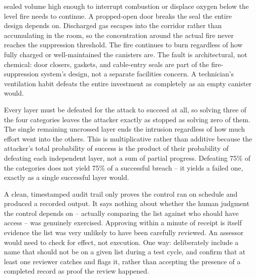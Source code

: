 \begin{answerkey}
sealed volume high enough to interrupt combustion or displace oxygen below the level fire needs to
continue. A propped-open door breaks the seal the entire design depends on.
Discharged gas escapes into the corridor rather than accumulating in the room, so the
concentration around the actual fire never reaches the suppression threshold. The fire continues
to burn regardless of how fully charged or well-maintained the canisters are. The fault is
architectural, not chemical: door closers, gaskets, and cable-entry seals are part of the
fire-suppression system's design, not a separate facilities concern. A technician's ventilation
habit defeats the entire investment as completely as an empty canister would.
\item Every layer must be defeated for the attack to succeed at all, so solving three of the four
categories leaves the attacker exactly as stopped as solving zero of them. The single remaining
uncrossed layer ends the intrusion regardless of how much effort went into the others. This is
multiplicative rather than additive because the attacker's total probability of success is the
product of their probability of defeating each independent layer, not a sum of partial progress.
Defeating 75\% of the categories does not yield 75\% of a successful breach -- it yields a failed
one, exactly as a single successful layer would.
\item A clean, timestamped audit trail only proves the control ran on schedule and produced a
recorded output. It says nothing about whether the human judgment the control depends on --
actually comparing the list against who should have access -- was genuinely exercised. Approving
within a minute of receipt is itself evidence the list was very unlikely to have been carefully
reviewed. An assessor would need to check for effect, not execution. One way: deliberately include
a name that should not be on a given list during a test cycle, and confirm that at least one
reviewer catches and flags it, rather than accepting the presence of a completed record as proof
the review happened.
\end{answerkey}
